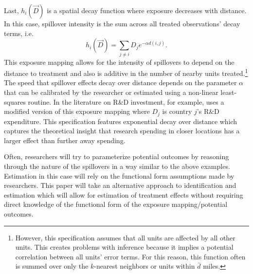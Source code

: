 \documentclass[11pt]{article}
\begin{document}
\begin{example}
    Last, $h_i(\vec{D})$ is a spatial decay function where exposure decreases with distance. In this case, spillover intensity is the sum across all treated observations' decay terms, i.e. \begin{equation}\label{eq:h_decay}
        h_i(\vec{D}) = \sum_{j \neq i} D_j e^{-\alpha d(i,j)}.
    \end{equation} 
    This exposure mapping allows for the intensity of spillovers to depend on the distance to treatment and also is additive in the number of nearby units treated.\footnote{However, this specification assumes that all units are affected by all other units. This creates problems with inference because it implies a potential correlation between all units' error terms. For this reason, this function often is summed over only the $k$-nearest neighbors or units within $\bar{d}$ miles.} The speed that spillover effects decay over distance depends on the parameter $\alpha$ that can be calibrated by the researcher or estimated using a non-linear least-squares routine. In the literature on R\&D investment, for example, \citet{Keller_2002} uses a modified version of this exposure mapping where $D_j$ is country $j$'s R\&D expenditure. This specification features exponential decay over distance which captures the theoretical insight that research spending in closer locations has a larger effect than further away spending.
\end{example}

Often, researchers will try to parameterize potential outcomes by reasoning through the nature of the spillovers in a way similar to the above examples. Estimation in this case will rely on the functional form assumptions made by researchers. This paper will take an alternative approach to identification and estimation which will allow for estimation of treatment effects without requiring direct knowledge of the functional form of the exposure mapping/potential outcomes. 
\end{document}
